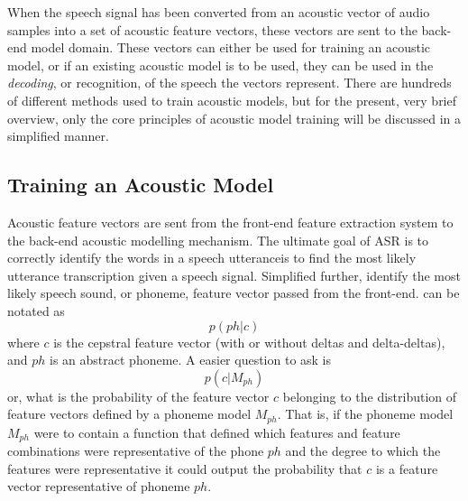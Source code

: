 When the speech signal has been converted from an acoustic vector of audio samples into a set of acoustic feature vectors, these vectors are sent to the back-end model domain.  These vectors can either be used for training an acoustic model, or if an existing acoustic model is to be used, they can be used in the \textit{decoding}, or recognition, of the speech the vectors represent.  There are hundreds of different methods used to train acoustic models, but for the present, very brief overview, only the core principles of acoustic model training will be discussed in a simplified manner.  

\DIFdelbegin \subsubsection{}
\addtocounter{subsubsection}{-1}%
\DIFdelend \DIFaddbegin \subsection{Training an Acoustic Model}\label{sec:acoust-mod}
\DIFaddend 

Acoustic feature vectors are sent from the front-end feature extraction system to the back-end acoustic modelling mechanism.  The ultimate goal of ASR is to correctly identify the words in a speech utterance\DIFdelbegin {}\DIFdelend \DIFaddbegin {}\DIFaddend is to find the most likely utterance transcription given a speech signal.  Simplified further, \DIFaddbegin {}\DIFaddend identify the most likely speech sound, or phoneme, \DIFdelbegin {}\DIFdelend \DIFaddbegin {}\DIFaddend feature vector passed from the front-end.  \DIFdelbegin {}\DIFdelend \DIFaddbegin {}\DIFaddend can be notated as \begin{equation} p(ph|c) \end{equation} where $c$ is the cepstral feature vector (with or without deltas and delta-deltas), and $ph$ is an abstract phoneme.  A \DIFdelbegin {}\DIFdelend \DIFaddbegin {}\DIFaddend easier question to ask \DIFdelbegin {}\DIFdelend is \begin{equation} p(c|M_{ph}) \end{equation} or, what is the probability of the feature vector $c$ belonging to the distribution of feature vectors defined by a phoneme model $M_{ph}$.  That is, if the phoneme model $M_{ph}$ were to contain a function that defined which features and feature combinations were representative of the phone $ph$ \DIFdelbegin \DIFdel{, }\DIFdelend \DIFaddbegin \DIFadd{- }\DIFaddend and the degree to which the features were representative \DIFdelbegin \DIFdel{, }\DIFdelend \DIFaddbegin \DIFadd{- }\DIFaddend it could output the probability that $c$ is a feature vector representative of phoneme $ph$.

